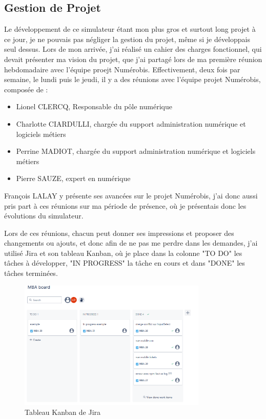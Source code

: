 \documentclass[a4paper,12pt]{report}
\begin{document}
\subsection{Gestion de Projet}
Le développement de ce simulateur étant mon plus gros et surtout long projet à ce jour, je ne pouvais pas négliger la gestion du projet, même si je développais seul dessus. Lors de mon arrivée, j'ai réalisé un cahier des charges fonctionnel, qui devait présenter ma vision du projet, que j'ai partagé lors de ma première réunion hebdomadaire avec l'équipe proejt Numérobis. Effectivement, deux fois par semaine, le lundi puis le jeudi, il y a des réunions avec l'équipe projet Numérobis, composée de :
\begin{itemize}
    \item Lionel CLERCQ, Responsable du pôle numérique
    \item Charlotte CIARDULLI, chargée du support administration numérique et logiciels métiers
    \item Perrine MADIOT, chargée du support administration numérique et logiciels métiers
    \item Pierre SAUZE, expert en numérique
\end{itemize}
François LALAY y présente ses avancées sur le projet Numérobis, j'ai donc aussi pris part à ces réunions sur ma période de présence, où je présentais donc les évolutions du simulateur. 


Lors de ces réunions, chacun peut donner ses impressions et proposer des changements ou ajouts, et donc afin de ne pas me perdre dans les demandes, j'ai utilisé Jira et son tableau Kanban, où je place dans la colonne "TO DO" les tâches à développer, "IN PROGRESS" la tâche en cours et dans "DONE" les tâches terminées.

\begin{figure}[H]
    \centering
    \includegraphics[width=0.8\textwidth]{kanban.png}
    \caption{Tableau Kanban de Jira}
    \label{fig:kanban-jira}
\end{figure}
\end{document}
